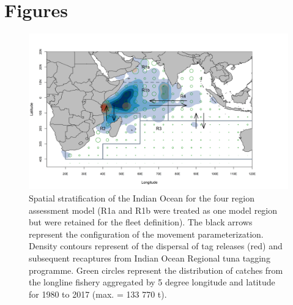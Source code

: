 \documentclass[12pt,halfline,a4paper,nonumbib]{ouparticle}
\begin{document}
\section{Figures}

\begin{figure}[!ht]
\centering
\includegraphics[width=6in]{figures/map.png}
\caption{Spatial stratification of the Indian Ocean for the four region assessment model (R1a and R1b were treated as one model region but were retained for the fleet definition). The black arrows represent the configuration of the movement parameterization.  Density contours represent of the dispersal of tag releases (red) and subsequent recaptures from Indian Ocean Regional tuna tagging programme. Green circles represent the distribution of catches from the longline fishery aggregated by 5 degree longitude and latitude for 1980 to 2017 (max. = 133 770 t).}
\label{fig:map}
\end{figure}
\end{document}
